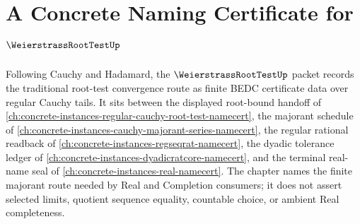 \chapter{A Concrete Naming Certificate for $\WeierstrassRootTestUp$}
\label{ch:concrete-instances-weierstrass-root-test-namecert}

Following Cauchy and Hadamard, the $\WeierstrassRootTestUp$ packet records the traditional root-test convergence route as finite BEDC certificate data over regular Cauchy tails. It sits between the displayed root-bound handoff of \autoref{ch:concrete-instances-regular-cauchy-root-test-namecert}, the majorant schedule of \autoref{ch:concrete-instances-cauchy-majorant-series-namecert}, the regular rational readback of \autoref{ch:concrete-instances-regseqrat-namecert}, the dyadic tolerance ledger of \autoref{ch:concrete-instances-dyadicratcore-namecert}, and the terminal real-name seal of \autoref{ch:concrete-instances-real-namecert}. The chapter names the finite majorant route needed by Real and Completion consumers; it does not assert selected limits, quotient sequence equality, countable choice, or ambient Real completeness.

